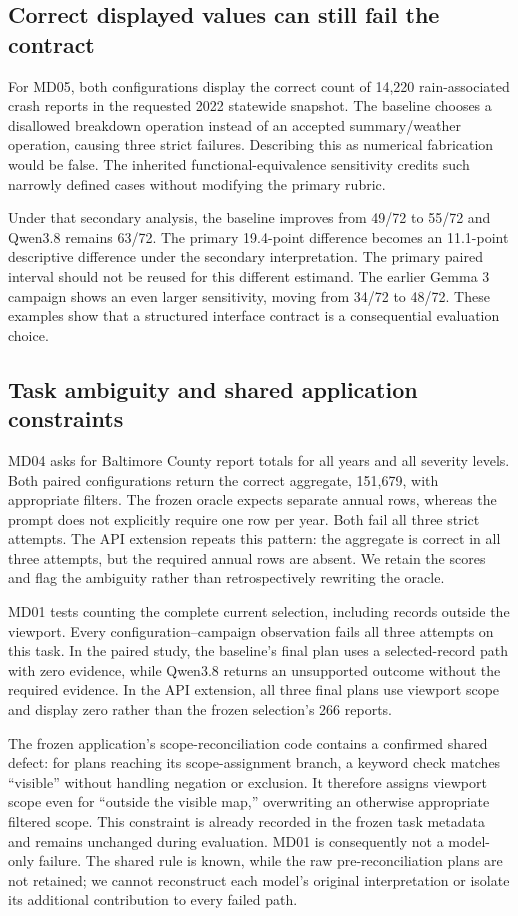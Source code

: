 \documentclass[10pt,twocolumn,letterpaper]{article}
\begin{document}
\subsection{Correct displayed values can still fail the contract}
For MD05, both configurations display the correct count of 14,220 rain-associated crash reports in the requested 2022 statewide snapshot. The baseline chooses a disallowed breakdown operation instead of an accepted summary/weather operation, causing three strict failures. Describing this as numerical fabrication would be false. The inherited functional-equivalence sensitivity credits such narrowly defined cases without modifying the primary rubric.

Under that secondary analysis, the baseline improves from 49/72 to 55/72 and Qwen3.8 remains 63/72. The primary 19.4-point difference becomes an 11.1-point descriptive difference under the secondary interpretation. The primary paired interval should not be reused for this different estimand. The earlier Gemma 3 campaign shows an even larger sensitivity, moving from 34/72 to 48/72. These examples show that a structured interface contract is a consequential evaluation choice.

\subsection{Task ambiguity and shared application constraints}
MD04 asks for Baltimore County report totals for all years and all severity levels. Both paired configurations return the correct aggregate, 151,679, with appropriate filters. The frozen oracle expects separate annual rows, whereas the prompt does not explicitly require one row per year. Both fail all three strict attempts. The API extension repeats this pattern: the aggregate is correct in all three attempts, but the required annual rows are absent. We retain the scores and flag the ambiguity rather than retrospectively rewriting the oracle.

MD01 tests counting the complete current selection, including records outside the viewport. Every configuration--campaign observation fails all three attempts on this task. In the paired study, the baseline's final plan uses a selected-record path with zero evidence, while Qwen3.8 returns an unsupported outcome without the required evidence. In the API extension, all three final plans use viewport scope and display zero rather than the frozen selection's 266 reports.

The frozen application's scope-reconciliation code contains a confirmed shared defect: for plans reaching its scope-assignment branch, a keyword check matches ``visible'' without handling negation or exclusion. It therefore assigns viewport scope even for ``outside the visible map,'' overwriting an otherwise appropriate filtered scope. This constraint is already recorded in the frozen task metadata and remains unchanged during evaluation. MD01 is consequently not a model-only failure. The shared rule is known, while the raw pre-reconciliation plans are not retained; we cannot reconstruct each model's original interpretation or isolate its additional contribution to every failed path.
\end{document}
